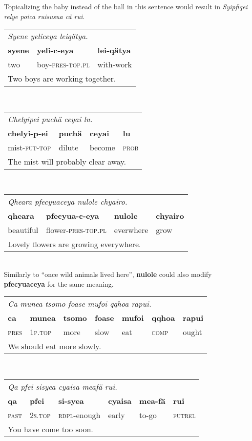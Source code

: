 \documentclass{article}
\begin{document}
Topicalizing the baby instead of the ball in this sentence would result in \emph{Syipfiqei relye poica ruisusua c\"a rui}.
\\[0.5cm]
\begin{tabular}{l l l}
\multicolumn{3}{l}{\emph{Syene yeliceya leiq\"atya.}} \\
\textbf{syene} & \textbf{yeli-c-eya} & \textbf{lei-q\"atya} \\
two & boy-\textsc{pres-top.pl} & with-work \\
\multicolumn{3}{l}{Two boys are working together.} \\
\end{tabular}
\\[0.5cm]
\begin{tabular}{l l l l}
\multicolumn{4}{l}{\emph{Chelyipei puch\"a ceyai lu.}} \\
\textbf{chelyi-p-ei} & \textbf{puch\"a} & \textbf{ceyai} & \textbf{lu} \\
mist-\textsc{fut-top} & dilute & become & \textsc{prob} \\
\multicolumn{4}{l}{The mist will probably clear away.} \\
\end{tabular}
\\[0.5cm]
\begin{tabular}{l l l l}
\multicolumn{4}{l}{\emph{Qheara pfecyuaceya nulole chyairo.}} \\
\textbf{qheara} & \textbf{pfecyua-c-eya} & \textbf{nulole} & \textbf{chyairo} \\
beautiful & flower-\textsc{pres-top.pl} & everwhere & grow \\
\multicolumn{4}{l}{Lovely flowers are growing everywhere.} \\
\end{tabular}
\\
Similarly to ``once wild animals lived here'', \textbf{nulole} could also modify \textbf{pfecyuaceya} for the same meaning.
\\[0.5cm]
\begin{tabular}{l l l l l l l}
\multicolumn{7}{l}{\emph{Ca munea tsomo foase mufoi qqhoa rapui.}} \\
\textbf{ca} & \textbf{munea} & \textbf{tsomo} & \textbf{foase} & \textbf{mufoi} & \textbf{qqhoa} & \textbf{rapui} \\
\textsc{pres} & \textsc{1p.top} & more & slow & eat & \textsc{comp} & ought \\
\multicolumn{7}{l}{We should eat more slowly.} \\
\end{tabular}
\\[0.5cm]
\begin{tabular}{l l l l l l}
\multicolumn{6}{l}{\emph{Qa pfei sisyea cyaisa meaf\"a rui.}} \\
\textbf{qa} & \textbf{pfei} & \textbf{si-syea} & \textbf{cyaisa} & \textbf{mea-f\"a} & \textbf{rui} \\
\textsc{past} & \textsc{2s.top} & \textsc{rdpl}-enough & early & to-go & \textsc{futrel} \\
\multicolumn{6}{l}{You have come too soon.} \\
\end{tabular}
\end{document}
